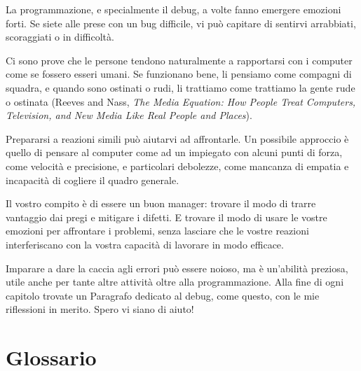 \documentclass[10pt]{book}
\begin{document}
La programmazione, e specialmente il debug, a volte fanno emergere emozioni forti. Se siete alle prese con un bug difficile, vi può capitare di sentirvi arrabbiati, scoraggiati o in difficoltà.

Ci sono prove che le persone tendono naturalmente a rapportarsi con i computer come se fossero esseri umani. Se funzionano bene, li pensiamo come compagni di squadra, e quando sono ostinati o rudi, li trattiamo come trattiamo la gente rude o ostinata (Reeves and Nass, {\it The Media Equation: How People Treat Computers, Television, and New Media Like Real People and Places}).

Prepararsi a reazioni simili può aiutarvi ad affrontarle. Un possibile approccio è quello di pensare al computer come ad un impiegato con alcuni punti di forza, come velocità e precisione, e particolari debolezze, come mancanza di empatia e incapacità di cogliere il quadro generale.

Il vostro compito è di essere un buon manager: trovare il modo di trarre vantaggio dai pregi e mitigare i difetti. E trovare il modo di usare le vostre emozioni per affrontare i problemi, senza lasciare che le vostre reazioni interferiscano con la vostra capacità di lavorare in modo efficace.

Imparare a dare la caccia agli errori può essere noioso, ma è un'abilità preziosa, utile anche per tante altre attività oltre alla programmazione. Alla fine di ogni capitolo trovate un Paragrafo dedicato al debug, come questo, con le mie riflessioni in merito. Spero vi siano di aiuto!



\section{Glossario}
\end{document}
